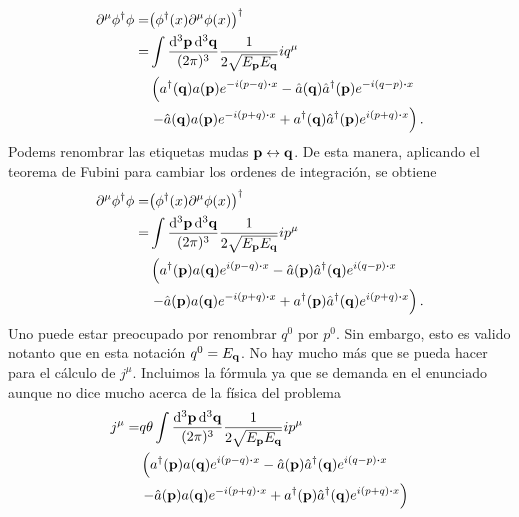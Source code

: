 \documentclass{article}
\begin{document}
\begin{enumerate}[(a)]
\begin{align}
\begin{split}
\partial^\mu\phi^\dagger\phi=&\qty(\phi^\dagger(x)\partial^\mu\phi(x))^\dagger\\
=&\int\frac{\dd[3]{\vb{p}}\dd[3]{\vb{q}}}{(2\pi)^3}\frac{1}{2\sqrt{E_{\vb{p}}E_{\vb{q}}}}iq^\mu\\
&\left(a^\dagger(\vb{q})a(\vb{p})e^{-i(p-q)\vdot x}-\hat{a}(\vb{q})\hat{a}^\dagger(\vb{p})e^{-i(q-p)\vdot x}\right.\\
&\left.-\hat{a}(\vb{q})a(\vb{p})e^{-i(p+q)\vdot x}+a^\dagger(\vb{q})\hat{a}^\dagger(\vb{p})e^{i(p+q)\vdot x}\right).
\end{split}
\end{align}
Podems renombrar las etiquetas mudas $\vb{p}\leftrightarrow\vb{q}$. De esta manera, aplicando el teorema de Fubini para cambiar los ordenes de integración, se obtiene 
\begin{align}\label{ec:corriente_escalar_2}
\begin{split}
\partial^\mu\phi^\dagger\phi=&\qty(\phi^\dagger(x)\partial^\mu\phi(x))^\dagger\\
=&\int\frac{\dd[3]{\vb{p}}\dd[3]{\vb{q}}}{(2\pi)^3}\frac{1}{2\sqrt{E_{\vb{p}}E_{\vb{q}}}}ip^\mu\\
&\left(a^\dagger(\vb{p})a(\vb{q})e^{i(p-q)\vdot x}-\hat{a}(\vb{p})\hat{a}^\dagger(\vb{q})e^{i(q-p)\vdot x}\right.\\
&\left.-\hat{a}(\vb{p})a(\vb{q})e^{-i(p+q)\vdot x}+a^\dagger(\vb{p})\hat{a}^\dagger(\vb{q})e^{i(p+q)\vdot x}\right).
\end{split}
\end{align}
Uno puede estar preocupado por renombrar $q^0$ por $p^0$. Sin embargo, esto es valido notanto que en esta notación $q^0=E_{\vb{q}}$. No hay mucho más que se pueda hacer para el cálculo de $j^\mu$. Incluimos la fórmula ya que se demanda en el enunciado aunque no dice mucho acerca de la física del problema
\begin{align}
\begin{split}
j^\mu=&q\theta\int\frac{\dd[3]{\vb{p}}\dd[3]{\vb{q}}}{(2\pi)^3}\frac{1}{2\sqrt{E_{\vb{p}}E_{\vb{q}}}}ip^\mu\\
&\left(a^\dagger(\vb{p})a(\vb{q})e^{i(p-q)\vdot x}-\hat{a}(\vb{p})\hat{a}^\dagger(\vb{q})e^{i(q-p)\vdot x}\right.\\
&\left.-\hat{a}(\vb{p})a(\vb{q})e^{-i(p+q)\vdot x}+a^\dagger(\vb{p})\hat{a}^\dagger(\vb{q})e^{i(p+q)\vdot x}\right)
\end{split}
\end{align}

\end{enumerate}
\end{document}
